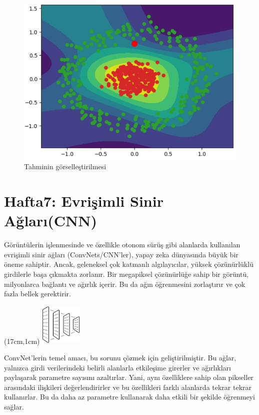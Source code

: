 \documentclass{article}
\begin{document}
\begin{figure}[h]
  \centering
  \includegraphics[width=1\textwidth]{image/Resim56.PNG} %
\caption{Tahminin görselleştirilmesi}
  \label{fig:cnn}  
\end{figure}



\section{Hafta7: Evrişimli Sinir Ağları(CNN)}
Görüntülerin işlenmesinde ve özellikle otonom sürüş gibi alanlarda kullanılan evrişimli sinir ağları (ConvNets/CNN'ler), yapay zeka dünyasında büyük bir öneme sahiptir. Ancak, geleneksel çok katmanlı algılayıcılar, yüksek çözünürlüklü girdilerle başa çıkmakta zorlanır. Bir megapiksel çözünürlüğe sahip bir görüntü, milyonlarca bağlantı ve ağırlık içerir. Bu da ağın öğrenmesini zorlaştırır ve çok fazla bellek gerektirir.\\[2pt]
\newpage
\begin{textblock*}{5cm}(17cm,1cm) %
    \includegraphics[width=2cm]{image/Resim45.png} %
\end{textblock*}

\noindent ConvNet'lerin temel amacı, bu sorunu çözmek için geliştirilmiştir. Bu ağlar, yalnızca girdi verilerindeki belirli alanlarla etkileşime girerler ve ağırlıkları paylaşarak parametre sayısını azaltırlar. Yani, aynı özelliklere sahip olan pikseller arasındaki ilişkileri değerlendirirler ve bu özellikleri farklı alanlarda tekrar tekrar kullanırlar. Bu da daha az parametre kullanarak daha etkili bir şekilde öğrenmeyi sağlar.\\[2pt]
\end{document}

